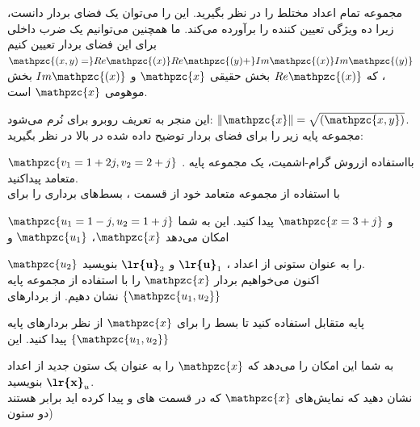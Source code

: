 \documentclass[a4paper,12pt]{report}
\begin{document}
 \hspace{-2.5cm}\textbf{}\hspace{0.6cm}
 مجموعه تمام اعداد مختلط را در نظر بگیرید. این را می‌توان یک فضای بردار دانست، زیرا ده ویژگی تعیین کننده را برآورده می‌کند. ما همچنین می‌توانیم یک ضرب داخلی برای این فضای بردار تعیین کنیم
 $ 
 \mathpzc{(x,y)=}Re\mathpzc{(x)}Re\mathpzc{(y)+}Im\mathpzc{(x)}Im\mathpzc{(y)}
 $
، که 
 $ Re\mathpzc{(x)} $
 بخش حقیقی $ \mathpzc{x} $ و 
 $ Im\mathpzc{(x)} $
 بخش موهومی $ \mathpzc{x} $ است.
 
 این منجر به تعریف روبرو برای نُرم می‌شود:
 $ \Vert \mathpzc{x} \Vert = \sqrt{(\mathpzc{x,y})} $.\\
 
 \textbf{}
 مجموعه پایه زیر را برای فضای بردار توضیح داده شده در بالا در نظر بگیرید: 
 
 \hspace{0.2cm}
 $ \mathpzc{v_1=1+2j, v_2=2+j} $
. بااستفاده ازروش گرام-اشمیت، یک مجموعه پایه متعامد پیداکنید.\\
 
 \textbf{}
 با استفاده از مجموعه متعامد خود از قسمت ، بسط‌های برداری را برای 
 
 \hspace{0.4cm}
 $ \mathpzc{u_1=1-j, u_2=1+j} $
 و
 $ \mathpzc{x=3+j} $
  پیدا کنید. این به شما امکان می‌دهد $ \mathpzc{x} $، $ \mathpzc{u_1} $ و 
  
  \hspace{0.4cm}
  $ \mathpzc{u_2} $ را به عنوان ستونی از اعداد
  \textbf{}، $ \textbf{\lr{u}}_1 $
  و
  $ \textbf{\lr{u}}_2 $
   بنویسید.\\
   
   \textbf{}
   اکنون می‌خواهیم بردار $ \mathpzc{x} $ را با استفاده از مجموعه پایه    
   $ \{\mathpzc{u_1,u_2}\} $
    نشان دهیم. از بردارهای 
    
    \hspace{0.5cm}
    پایه متقابل استفاده کنید تا بسط را برای $ \mathpzc{x} $ از نظر بردارهای پایه 
    $ \{\mathpzc{u_1,u_2}\} $
     پیدا کنید. این 
     
     \hspace{0.5cm}
     به شما این امکان را می‌دهد که $ \mathpzc{x} $ را به عنوان یک ستون جدید از اعداد 
     $ \textbf{\lr{x}}_u $ 
     بنویسید.\\
     
     \textbf{}
     نشان دهید که نمایش‌های $ \mathpzc{x} $ که در قسمت های  و  پیدا کرده اید برابر هستند (دو ستون 
     
\end{document}
